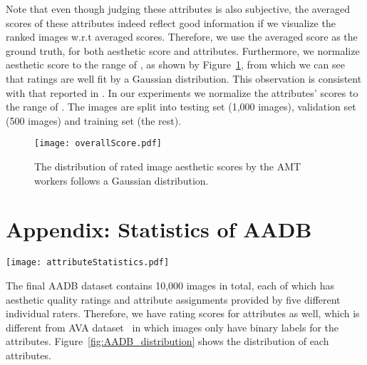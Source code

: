 \documentclass[runningheads]{llncs}
\begin{document}
Note that even though judging these attributes is also subjective,
the averaged scores of these attributes indeed reflect good information if we visualize the ranked images w.r.t averaged scores.
Therefore,
we use the averaged score as the ground truth, for both aesthetic score and attributes.
Furthermore,
we normalize aesthetic score to the range of , as shown by Figure~\ref{fig:overallScoreDistribution},
from which we can see  that ratings
are well fit by a Gaussian distribution.
This observation is consistent with that reported in \cite{murray2012ava}.
In our experiments
we  normalize the attributes' scores to the range of .
The images are split into testing set (1,000 images), validation set (500 images) and training set (the rest).


\begin{figure}[!ht]
\begin{center}
\texttt{[image: overallScore.pdf]}
\end{center}
   \caption{The distribution of rated image aesthetic scores by the AMT workers follows a Gaussian distribution.}
\label{fig:overallScoreDistribution}
\end{figure}

\section*{Appendix: Statistics of AADB}
\label{sec:statAADB}

\begin{figure*}[!th]
\begin{center}
   \texttt{[image: attributeStatistics.pdf]}
\end{center}
   \caption{The distributions of all the eleven attributes.
   Note that for attributes repetition and symmetry,
   we do not let AMT workers annotate negative labels, as these attributes are of neutral meaning.
   Instead, we only allow them to point out whether there exist repetition or symmetry.
   To solve the data imbalance problem in training attribute classifiers, we adopt some data augmentation tricks to sample more rare cases.}
\label{fig:AADB_distribution}
\end{figure*}

The final AADB dataset
contains  10,000 images in total, each of which has aesthetic quality
ratings and attribute assignments provided by five different individual raters.
Therefore, we have rating scores for attributes as well,
which is different from AVA dataset~\cite{murray2012ava} in which images only have binary labels for the attributes.
Figure~\ref{fig:AADB_distribution} shows the distribution of each attributes.
\end{document}
